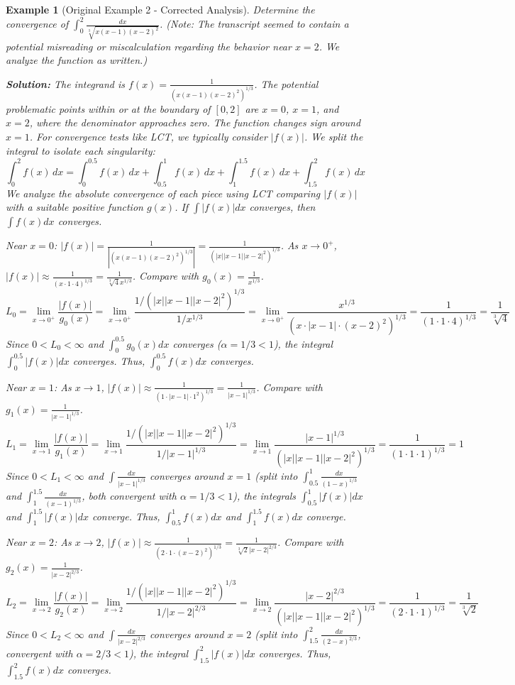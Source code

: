 \documentclass[11pt]{article}
\theoremstyle{mytheoremstyle}
\theoremstyle{mydefinitionstyle}
\newtheorem{example}[theorem]{Example}
\begin{document}
\begin{example}[Original Example 2 - Corrected Analysis]
Determine the convergence of $\int_0^2 \frac{dx}{\sqrt[3]{x(x-1)(x-2)^2}}$.
(Note: The transcript seemed to contain a potential misreading or miscalculation regarding the behavior near $x=2$. We analyze the function as written.)

\textbf{Solution:}
The integrand is $f(x) = \frac{1}{\left(x(x-1)(x-2)^2\right)^{1/3}}$. The potential problematic points within or at the boundary of $[0, 2]$ are $x=0$, $x=1$, and $x=2$, where the denominator approaches zero. The function changes sign around $x=1$. For convergence tests like LCT, we typically consider $|f(x)|$.
We split the integral to isolate each singularity:
\[ \int_0^2 f(x) \, dx = \int_0^{0.5} f(x) \, dx + \int_{0.5}^1 f(x) \, dx + \int_1^{1.5} f(x) \, dx + \int_{1.5}^2 f(x) \, dx \]
We analyze the absolute convergence of each piece using LCT comparing $|f(x)|$ with a suitable positive function $g(x)$. If $\int |f(x)| dx$ converges, then $\int f(x) dx$ converges.

\emph{Near $x=0$:}
$|f(x)| = \frac{1}{|\left(x(x-1)(x-2)^2\right)^{1/3}|} = \frac{1}{(|x||x-1||x-2|^2)^{1/3}}$.
As $x \to 0^+$, $|f(x)| \approx \frac{1}{(x \cdot 1 \cdot 4)^{1/3}} = \frac{1}{\sqrt[3]{4} x^{1/3}}$.
Compare with $g_0(x) = \frac{1}{x^{1/3}}$.
\[ L_0 = \lim_{x \to 0^+} \frac{|f(x)|}{g_0(x)} = \lim_{x \to 0^+} \frac{1/(|x||x-1||x-2|^2)^{1/3}}{1/x^{1/3}} = \lim_{x \to 0^+} \frac{x^{1/3}}{(x \cdot |x-1| \cdot (x-2)^2)^{1/3}} = \frac{1}{(1 \cdot 1 \cdot 4)^{1/3}} = \frac{1}{\sqrt[3]{4}} \]
Since $0 < L_0 < \infty$ and $\int_0^{0.5} g_0(x) dx$ converges ($\alpha=1/3<1$), the integral $\int_0^{0.5} |f(x)| dx$ converges. Thus, $\int_0^{0.5} f(x) dx$ converges.

\emph{Near $x=1$:}
As $x \to 1$, $|f(x)| \approx \frac{1}{(1 \cdot |x-1| \cdot 1^2)^{1/3}} = \frac{1}{|x-1|^{1/3}}$.
Compare with $g_1(x) = \frac{1}{|x-1|^{1/3}}$.
\[ L_1 = \lim_{x \to 1} \frac{|f(x)|}{g_1(x)} = \lim_{x \to 1} \frac{1/(|x||x-1||x-2|^2)^{1/3}}{1/|x-1|^{1/3}} = \lim_{x \to 1} \frac{|x-1|^{1/3}}{(|x||x-1||x-2|^2)^{1/3}} = \frac{1}{(1 \cdot 1 \cdot 1)^{1/3}} = 1 \]
Since $0 < L_1 < \infty$ and $\int \frac{dx}{|x-1|^{1/3}}$ converges around $x=1$ (split into $\int_{0.5}^1 \frac{dx}{(1-x)^{1/3}}$ and $\int_1^{1.5} \frac{dx}{(x-1)^{1/3}}$, both convergent with $\alpha=1/3<1$), the integrals $\int_{0.5}^1 |f(x)| dx$ and $\int_1^{1.5} |f(x)| dx$ converge. Thus, $\int_{0.5}^1 f(x) dx$ and $\int_1^{1.5} f(x) dx$ converge.

\emph{Near $x=2$:}
As $x \to 2$, $|f(x)| \approx \frac{1}{(2 \cdot 1 \cdot (x-2)^2)^{1/3}} = \frac{1}{\sqrt[3]{2} |x-2|^{2/3}}$.
Compare with $g_2(x) = \frac{1}{|x-2|^{2/3}}$.
\[ L_2 = \lim_{x \to 2} \frac{|f(x)|}{g_2(x)} = \lim_{x \to 2} \frac{1/(|x||x-1||x-2|^2)^{1/3}}{1/|x-2|^{2/3}} = \lim_{x \to 2} \frac{|x-2|^{2/3}}{(|x||x-1||x-2|^2)^{1/3}} = \frac{1}{(2 \cdot 1 \cdot 1)^{1/3}} = \frac{1}{\sqrt[3]{2}} \]
Since $0 < L_2 < \infty$ and $\int \frac{dx}{|x-2|^{2/3}}$ converges around $x=2$ (split into $\int_{1.5}^2 \frac{dx}{(2-x)^{2/3}}$, convergent with $\alpha=2/3<1$), the integral $\int_{1.5}^2 |f(x)| dx$ converges. Thus, $\int_{1.5}^2 f(x) dx$ converges.


\end{example}
\end{document}
